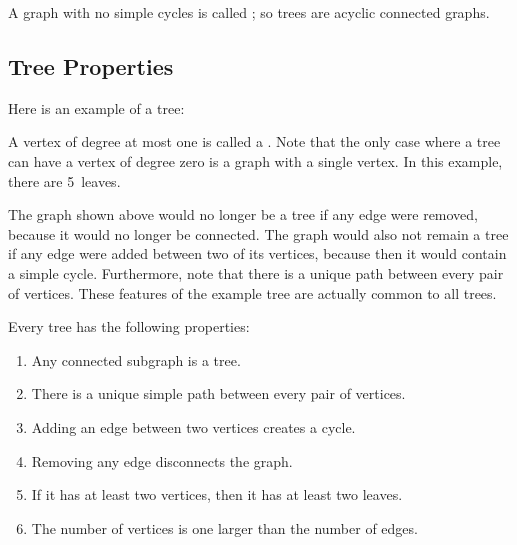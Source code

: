 A graph with no simple cycles is called ; so trees are
acyclic connected graphs.

\subsection{Tree Properties}

Here is an example of a tree:


A vertex of degree at most one is called a .  Note that the only
case where a tree can have a vertex of degree zero is a graph with a single
vertex.  In this example, there are 5~leaves.

The graph shown above would no longer be a tree if any edge were removed,
because it would no longer be connected.  The graph would also not remain
a tree if any edge were added between two of its vertices, because then it
would contain a simple cycle.  Furthermore, note that there is a unique
path between every pair of vertices.  These features of the example tree
are actually common to all trees.

\begin{theorem}\label{th:treeprops}
Every tree has the following properties:

\begin{enumerate}
\item Any connected subgraph is a tree.
\item There is a unique simple path between every pair of vertices.
\item Adding an edge between two vertices creates a cycle.
\item Removing any edge disconnects the graph.
\item If it has at least two vertices, then it has at least two leaves.
\item The number of vertices is one larger than the number of edges.
\end{enumerate}
\end{theorem}

